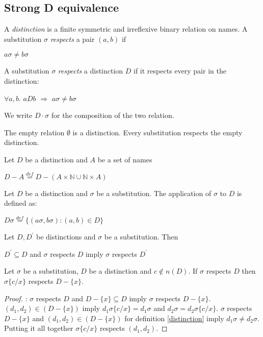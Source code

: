 \subsection{Strong D equivalence}

\begin{definition}\label{distinction}
  A \emph{distinction} is a finite symmetric and irreflexive binary relation on names. A substitution $\sigma$ \emph{respects} a pair $(a,b)$ if 
  \begin{center}
     $a\sigma\neq b\sigma$
  \end{center}
  A substitution $\sigma$ \emph{respects} a distinction $D$ if it respects every pair in the distinction:
  \begin{center}
     $\forall a,b.$ $aDb$ $\Rightarrow$ $a\sigma\neq b\sigma$
  \end{center}
  We write $D \cdot \sigma$ for the composition of the two relation.
\end{definition}

\begin{example}
  The empty relation $\emptyset$ is a distinction. Every substitution respects the empty distinction.
\end{example}

\begin{definition}
  Let $D$ be a distinction and $A$ be a set of names
  \begin{center}
    $D-A \stackrel{def}{=} D - (A\times \mathbb{N} \cup \mathbb{N} \times A)$
  \end{center}
\end{definition}

\begin{definition}
  Let $D$ be a distinction and $\sigma$ be a substitution. The application of $\sigma$ to $D$ is defined as:
  \begin{center}
    $D\sigma \stackrel{def}{=} \{(a\sigma,b\sigma): (a,b)\in D\}$
  \end{center}
\end{definition}

\begin{proposition}
  Let $D,D^{'}$ be distinctions and $\sigma$ be a substitution. Then
  \begin{center}
    $D^{'}\subseteq D$ and $\sigma$ respects $D$ imply $\sigma$ respects $D^{'}$
  \end{center}
\end{proposition}


\begin{lemma}\label{distinctionSubstitution}
  Let $\sigma$ be a substitution, $D$ be a distinction and $c\notin n(D)$. If $\sigma$ respects $D$ then $\sigma\{c/x\}$ respects $D-\{x\}$.
  \begin{proof}:
    $\sigma$ respects $D$ and $D-\{x\}\subseteq D$ imply $\sigma$ respects $D-\{x\}$. $(d_{1},d_{2}) \in (D-\{x\})$ imply $d_{1} \sigma\{c/x\} = d_{1} \sigma$ and $d_{2} \sigma = d_{2} \sigma\{c/x\}$. $\sigma$ respects $D-\{x\}$ and $(d_{1},d_{2}) \in (D-\{x\})$ for definition \ref{distinction} imply $d_{1} \sigma \neq d_{2} \sigma$.  Putting it all together $\sigma \{c/x\}$ respects $(d_{1}, d_{2})$.
  \end{proof}
\end{lemma}


